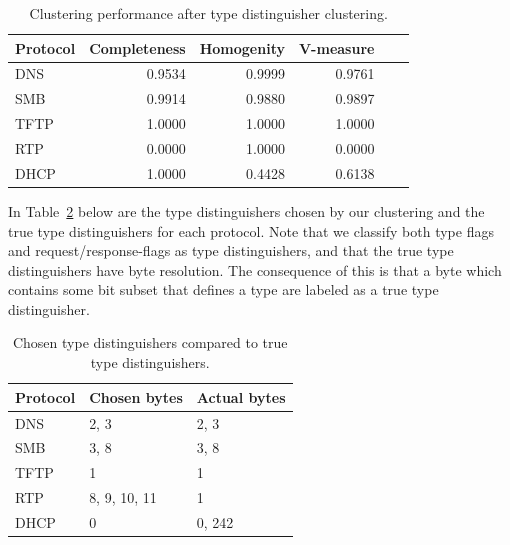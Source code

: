\documentclass[a4paper]{report}
\begin{document}
\begin{table}[h]
    \centering
    \captionsetup{width=0.8\textwidth}
    \caption{Clustering performance after type distinguisher clustering.}
    \begin{tabular}{| l | r | r | r | r | r |}
        \hline
        \textbf{Protocol}&\textbf{Completeness}&\textbf{Homogenity}&\textbf{V-measure} \\ \hline
        DNS & 0.9534 & 0.9999 & 0.9761 \\ \hline
        SMB & 0.9914 & 0.9880 & 0.9897 \\ \hline
        TFTP & 1.0000 & 1.0000 & 1.0000 \\ \hline
        RTP & 0.0000 & 1.0000 & 0.0000 \\ \hline
        DHCP & 1.0000 & 0.4428 & 0.6138 \\ \hline
    \end{tabular}
    \label{tab:tdclusterresults}
\end{table}






In Table~\ref{tab:typedistinguishers} below are the type distinguishers chosen
by our clustering and the true type distinguishers for each protocol. Note that
we classify both type flags and request/response-flags as type distinguishers,
and that the true type distinguishers have byte resolution. The consequence of
this is that a byte which contains some bit subset that defines a type are
labeled as a true type distinguisher.

\begin{table}[h]
    \centering
    \captionsetup{width=0.8\textwidth}
    \caption{Chosen type distinguishers compared to true type distinguishers.}
    \begin{tabular}{| l | l | l |}
        \hline
        \textbf{Protocol}&\textbf{Chosen bytes}&\textbf{Actual bytes}\\ \hline
        DNS  & 2, 3         & 2, 3  \\ \hline
        SMB  & 3, 8         & 3, 8  \\ \hline
        TFTP & 1            & 1     \\ \hline
        RTP  & 8, 9, 10, 11 & 1     \\ \hline
        DHCP & 0            & 0, 242\\ \hline
    \end{tabular}
    \label{tab:typedistinguishers}
\end{table}
\end{document}
